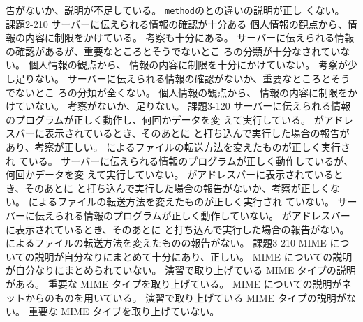 \documentclass[a4j]{jreport}
\begin{document}
{{{	告がないか、説明が不足している。}
	{\texttt{method}のとの違いの説明が正し
	くない。}
}
{\ResultA}
{課題2-2}{10}
{
  {サーバーに伝えられる情報の確認が十分ある}
	{個人情報の観点から、情報の内容に制限をかけている。}
	{考察も十分にある。}
}
{
  {サーバーに伝えられる情報の確認があるが、重要なところとそうでないとこ
	ろの分類が十分なされていない。}
	{個人情報の観点から、	情報の内容に制限を十分にかけていない。}
	{考察が少し足りない。}
}
{
  {サーバーに伝えられる情報の確認がないか、重要なところとそうでないとこ
	ろの分類が全くない。}
	{個人情報の観点から、	情報の内容に制限をかけていない。}
	{考察がないか、足りない。}
}
{\ResultEFI}
{課題3-1}{20}
{
  {サーバーに伝えられる情報のプログラムが正しく動作し、何回かデータを変
	えて実行している。}
	{がアドレスバーに表示されているとき、そのあとに
				と打ち込んで実行した場合の報告があり、考察が正しい。}
	{によるファイルの転送方法を変えたものが正しく実行され
	ている。}
}
{
  {サーバーに伝えられる情報のプログラムが正しく動作しているが、何回かデータを変
	えて実行していない。}
	{がアドレスバーに表示されているとき、そのあとに
				と打ち込んで実行した場合の報告がないか、考察が正しくない。}
	{によるファイルの転送方法を変えたものが正しく実行され
	ていない。}
}
{
  {サーバーに伝えられる情報のプログラムが正しく動作していない。}
	{がアドレスバーに表示されているとき、そのあとに
				と打ち込んで実行した場合の報告がない。}
	{によるファイルの転送方法を変えたものの報告がない。}
}
{\ResultA}
{課題3-2}{10}
{
  {MIME についての説明が自分なりにまとめて十分にあり、正しい。}
}
{
  {MIME についての説明が自分なりにまとめられていない。}
	{演習で取り上げている MIME タイプの説明がある。}
	{重要な MIME タイプを取り上げている。}
}
{
  {MIME についての説明がネットからのものを用いている。}
	{演習で取り上げている MIME タイプの説明がない。}
	{重要な MIME タイプを取り上げていない。}
}
{\ResultEI}
}
\end{document}
